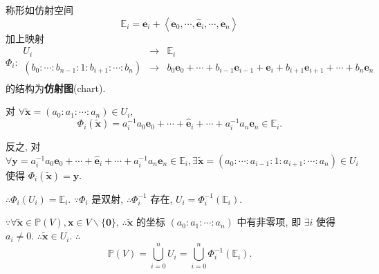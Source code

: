 \documentclass[color=black,device=normal,lang=cn,mode=geye]{elegantnote}
\begin{document}
称形如仿射空间
\[\mathbb{E}_i=\boldsymbol{e}_i+\left<\boldsymbol{e}_0,\cdots,\widehat{\boldsymbol{e}}_i,\cdots,\boldsymbol{e}_n\right>\]
加上映射
\[\Phi_i:\begin{array}{rcl}
    U_i & \to & \mathbb{E}_i \\
    (b_0:\cdots:b_{n-1}:1:b_{i+1}:\cdots:b_n) & \to & b_0\boldsymbol{e}_0+\cdots+b_{i-1}\boldsymbol{e}_{i-1}+\boldsymbol{e}_i+b_{i+1}\boldsymbol{e}_{i+1}+\cdots+b_n\boldsymbol{e}_n \\
\end{array}\]
的结构为\textbf{仿射图}(chart).

对 $\forall\tilde{\boldsymbol{x}}=(a_0:a_1:\cdots:a_n)\in U_i$,
\[\Phi_i(\tilde{\boldsymbol{x}})=a_i^{-1}a_0\boldsymbol{e}_0+\cdots+\widehat{\boldsymbol{e}}_i+\cdots+a_i^{-1}a_n\boldsymbol{e}_n\in\mathbb{E}_i.\]

反之, 对 $\forall\boldsymbol{y}=a_i^{-1}a_0\boldsymbol{e}_0+\cdots+\widehat{\boldsymbol{e}}_i+\cdots+a_i^{-1}a_n\boldsymbol{e}_n\in\mathbb{E}_i,\exists\tilde{\boldsymbol{x}}=(a_0:\cdots:a_{i-1}:1:a_{i+1}:\cdots:a_n)\in U_i$ 使得 $\Phi_i(\tilde{\boldsymbol{x}})=\boldsymbol{y}$.

$\therefore\Phi_i(U_i)=\mathbb{E}_i$. $\because\Phi_i$ 是双射, $\therefore\Phi_i^{-1}$ 存在, $U_i=\Phi_i^{-1}(\mathbb{E}_i)$.

$\because\forall\tilde{\boldsymbol{x}}\in\mathbb{P}(V),\boldsymbol{x}\in V\backslash\{\boldsymbol{0}\}$, $\therefore\tilde{\boldsymbol{x}}$ 的坐标 $(a_0:a_1:\cdots:a_n)$ 中有非零项, 即 $\exists i$ 使得 $a_i\neq0$. $\therefore\tilde{\boldsymbol{x}}\in U_i$. $\therefore$
\[\mathbb{P}(V)=\bigcup\limits_{i=0}^nU_i=\bigcup\limits_{i=0}^n\Phi_i^{-1}(\mathbb{E}_i).\]
\end{document}
